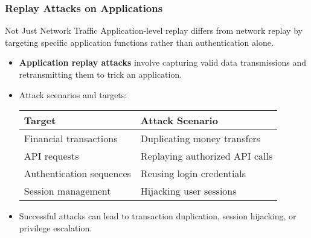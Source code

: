 \documentclass{beamer}
\begin{document}
\begin{frame}
    \frametitle{Replay Attacks on Applications}
    
    \begin{alertblock}{Not Just Network Traffic}
        Application-level replay differs from network replay by targeting specific application functions rather than authentication alone.
    \end{alertblock}
    
    \begin{itemize}
        \item \textbf{Application replay attacks} involve capturing valid data transmissions and retransmitting them to trick an application.
        \item Attack scenarios and targets:
        
        \begin{tabular}{l|l}
            \textbf{Target} & \textbf{Attack Scenario} \\
            \hline
            Financial transactions & Duplicating money transfers \\
            API requests & Replaying authorized API calls \\
            Authentication sequences & Reusing login credentials \\
            Session management & Hijacking user sessions \\
        \end{tabular}
        
        \item Successful attacks can lead to transaction duplication, session hijacking, or privilege escalation.
 
    \end{itemize}
\end{frame}
\end{document}
